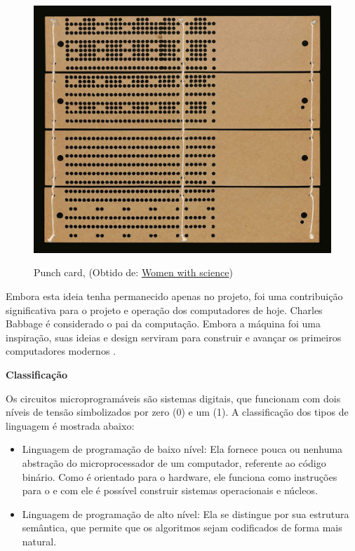 \documentclass[11pt, letterpaper, portuguese]{article}
\begin{document}
\begin{figure}
	    \centering
		\caption{Punch card, (Obtido de: \href{https://mujeresconciencia.com/2018/06/27/tarjetas-para-programar-el-mundo/}{Women with science})}
		\includegraphics[width=0.5 \textwidth]{Tarjeta.jpg}
		\label{Fig-Perforada}
\end{figure}

\par{Embora esta ideia tenha permanecido apenas no projeto, foi uma contribuição significativa para o projeto e operação dos computadores de hoje. Charles Babbage é considerado o pai da computação. Embora a máquina foi uma inspiração, suas ideias e design serviram para construir e avançar os primeiros computadores modernos  \cite{garfinkel_shevtsov_guo_2017}.}

\vspace{0.5 cm}

   \textbf{Classificação}
   \par{Os circuitos microprogramáveis são sistemas digitais, que funcionam com dois níveis de tensão simbolizados por zero (0) e um (1). A classificação dos tipos de linguagem é mostrada abaixo:}
   
   \begin{itemize}
       \item{Linguagem de programação de baixo nível: Ela fornece pouca ou nenhuma abstração do microprocessador de um computador, referente ao código binário. Como é orientado para o hardware, ele funciona como instruções para o e com ele é possível construir sistemas operacionais e núcleos.}
        \item{Linguagem de programação de alto nível: Ela se distingue por sua estrutura semântica, que permite que os algoritmos sejam codificados de forma mais natural.}
   \end{itemize} 
   
\end{document}
